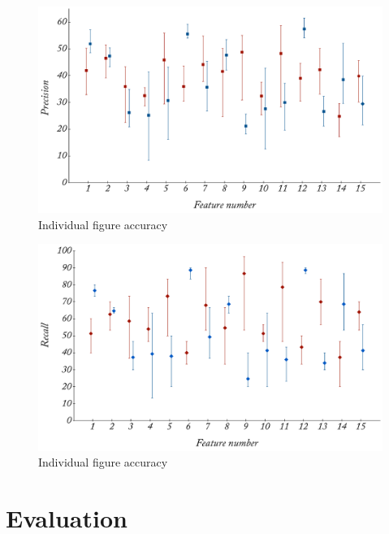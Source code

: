 \begin{figure}
	\caption{Individual figure accuracy}
	\label{fig:polarity_precision}
	\centering
		\includegraphics[width=1.0\textwidth]{graphs/polarity_p.pdf}
\end{figure}

\begin{figure}
	\caption{Individual figure accuracy}
	\label{fig:polarity_recall}
	\centering
		\includegraphics[width=1.0\textwidth]{graphs/polarity_r.pdf}
\end{figure}


\section{Evaluation}


